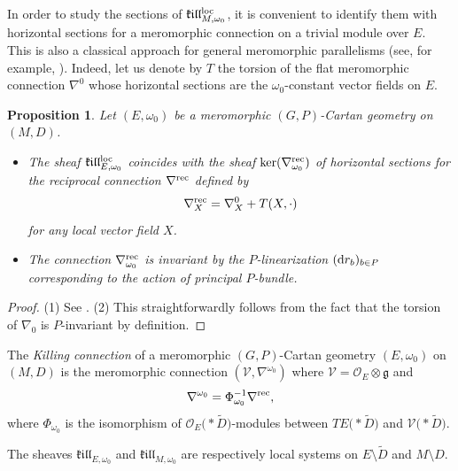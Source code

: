 \documentclass[10pt,a4paper]{amsart}
\numberwithin{equation}{section}
\newtheorem{Proposition}[Theorem]{Proposition}
 { \theoremstyle{definition}
\newtheorem{Definition}[Theorem]{Definition}
\newtheorem{Note}[Theorem]{Note}
\newtheorem{Exemple}[Theorem]{Example}
\newtheorem{Remark}[Theorem]{Remark} }
\begin{document}
In order to study the sections of $\mathfrak{k}\mathfrak{i}\mathfrak{l}\mathfrak{l}^{\rm loc}_{M,\omega_0}$, it is convenient to identify them with horizontal sections for a meromorphic connection on a trivial module over $E$. This is also a classical approach for general meromorphic parallelisms (see, for example, \cite[Lemma~3.2]{BlazquezCasale}). Indeed, let us denote by $T$ the torsion of the flat meromorphic connection $\nabla^0$ whose horizontal sections are the $\omega_0$-constant vector fields on $E$. %

\begin{Proposition}\label{connkillprop} Let $(E,\omega_0)$ be a meromorphic $(G,P)$-Cartan geometry on $(M,D)$.
\begin{itemize}\itemsep=0pt
\item[$(1)$] The sheaf $\mathfrak{k}\mathfrak{i}\mathfrak{l}\mathfrak{l}^{\rm loc}_{E,\omega_0}$ coincides with the sheaf $\ker(\nabla^{\rm rec}_{\omega_0})$ of horizontal sections for the reciprocal connection $\nabla^{\rm rec}$ defined by
\[ \nabla^{\rm rec}_X = \nabla^0_X + T(X,\cdot)\]
 for any local vector field $X$.
\item[$(2)$] The connection $\nabla^{\rm rec}_{\omega_0}$ is invariant by the $P$-linearization $({\rm d}r_b)_{b\in P}$ corresponding to the action of principal $P$-bundle.
\end{itemize}
\end{Proposition}
\begin{proof} (1) See \cite[Lemma 3.2]{BlazquezCasale}.  (2) This straightforwardly follows from the fact that the torsion of $\nabla_0$ is $P$-invariant by definition.
\end{proof}

\begin{Definition}\label{connkill} The \textit{Killing connection} of a meromorphic $(G,P)$-Cartan geometry $(E,\omega_0)$ on~$(M,D)$ is the meromorphic connection $(\mathcal{V},\nabla^{\omega_0})$ where $\mathcal{V}=\mathcal{O}_E\otimes \mathfrak{g}$ and
\[\nabla^{\omega_0}= \Phi_{\omega_0}^{-1} \nabla^{\rm rec},\]
 where $\Phi_{\omega_0}$ is the isomorphism of $\mathcal{O}_E\bigl(* \tilde{D}\bigr)$-modules between $TE\bigl(* \tilde{D}\bigr)$ and $\mathcal{V}\bigl(* \tilde{D}\bigr)$.
\end{Definition}

The sheaves $\mathfrak{k}\mathfrak{i}\mathfrak{l}\mathfrak{l}_{E,\omega_0}$ and $\mathfrak{k}\mathfrak{i}\mathfrak{l}\mathfrak{l}_{M,\omega_0}$ are respectively local systems on $E\setminus \tilde{D}$ and $M\setminus D$.
\end{document}
